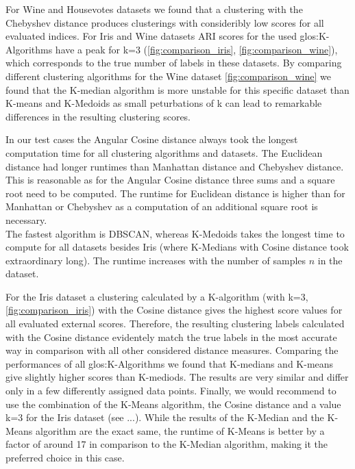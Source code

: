 


For Wine and Housevotes datasets we found that a clustering with the Chebyshev distance produces clusterings with consideribly low scores for all evaluated indices. 
For Iris and Wine datasets ARI scores for the used \Gls{glos:K-Algorithms} have a peak for k=3 (\autoref{fig:comparison_iris}, \autoref{fig:comparison_wine}), which corresponds to the true number of labels in these datasets.  
By comparing different clustering algorithms for the Wine dataset \autoref{fig:comparison_wine} we found that the K-median algorithm is more unstable for this specific dataset than K-means and K-Medoids as small peturbations of k can lead to remarkable differences in the resulting clustering scores. 

In our test cases the Angular Cosine distance always took the longest computation time for all clustering algorithms and datasets. The Euclidean distance had longer runtimes than Manhattan distance and Chebyshev distance. This is reasonable as for the Angular Cosine distance three sums and a square root need to be computed. The runtime for Euclidean distance is higher than for Manhattan or Chebyshev as a computation of an additional square root is necessary.\\
The fastest algorithm is DBSCAN, whereas K-Medoids takes the longest time to compute for all datasets besides Iris (where K-Medians with Cosine distance took extraordinary long). The runtime increases with the number of samples $n$ in the dataset. 

For the Iris dataset a clustering calculated by a K-algorithm (with k=3, \autoref{fig:comparison_iris}) with the Cosine distance gives the highest score values for all evaluated external scores. Therefore, the resulting clustering labels calculated with the Cosine distance evidentely match the true labels in the most accurate way in comparison with all other considered distance measures. Comparing the performances of all \Gls{glos:K-Algorithms} we found that K-medians and K-means give slightly higher scores than K-mediods. The results are very similar and differ only in a few differently assigned data points.
Finally, we would recommend to use the combination of the K-Means algorithm, the Cosine distance and a value k=3 for the Iris dataset (see ...). While the results of the K-Median and the K-Means algorithm are the exact same, the runtime of K-Means is better by a factor of around 17 in comparison to the K-Median algorithm, making it the preferred choice in this case. \\

